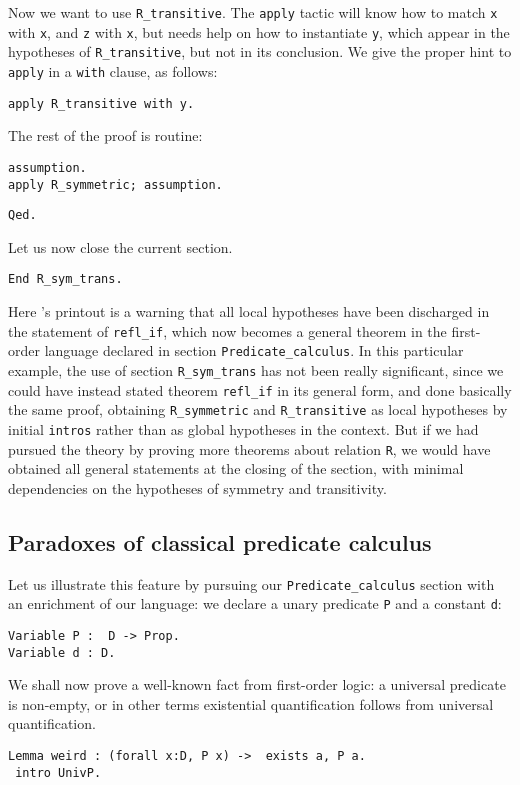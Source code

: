 \documentclass{book}
\begin{document}
Now we want to use \verb:R_transitive:. The \verb:apply: tactic will know
how to match \verb:x: with \verb:x:, and \verb:z: with \verb:x:, but needs
help on how to instantiate \verb:y:, which appear in the hypotheses of
\verb:R_transitive:, but not in its conclusion. We give the proper hint
to \verb:apply: in a \verb:with: clause, as follows:
\begin{lstlisting}
apply R_transitive with y.
\end{lstlisting}

The rest of the proof is routine:
\begin{lstlisting}
assumption.
apply R_symmetric; assumption.
\end{lstlisting}
\begin{lstlisting}
Qed.
\end{lstlisting}

Let us now close the current section.
\begin{lstlisting}
End R_sym_trans.
\end{lstlisting}

Here \Coq's printout is a warning that all local hypotheses have been 
discharged in the statement of \verb:refl_if:, which now becomes a general
theorem in the first-order language declared in section 
\verb:Predicate_calculus:. In this particular example, the use of section
\verb:R_sym_trans: has not been really significant, since we could have
instead stated theorem \verb:refl_if: in its general form, and done 
basically the same proof, obtaining \verb:R_symmetric: and
\verb:R_transitive: as local hypotheses by initial \verb:intros: rather
than as global hypotheses in the context. But if we had pursued the
theory by proving more theorems about relation \verb:R:,
we would have obtained all general statements at the closing of the section,
with minimal dependencies on the hypotheses of symmetry and transitivity.

\subsection{Paradoxes of classical predicate calculus}

Let us illustrate this feature by pursuing our \verb:Predicate_calculus:
section with an enrichment of our language: we declare a unary predicate
\verb:P: and a constant \verb:d::
\begin{lstlisting}
Variable P :  D -> Prop.
Variable d : D.
\end{lstlisting}

We shall now prove a well-known fact from first-order logic: a universal 
predicate is non-empty, or in other terms existential quantification 
follows from universal quantification.
\begin{lstlisting}
Lemma weird : (forall x:D, P x) ->  exists a, P a.
 intro UnivP.
\end{lstlisting}
\end{document}
